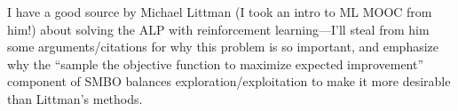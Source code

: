 I have a good source by Michael Littman (I took an intro to ML MOOC from him!) about solving the ALP with reinforcement learning---I'll steal from him some arguments/citations for why this problem is so important, and emphasize why the ``sample the objective function to maximize expected improvement'' component of SMBO balances exploration/exploitation to make it more desirable than Littman's methods.
